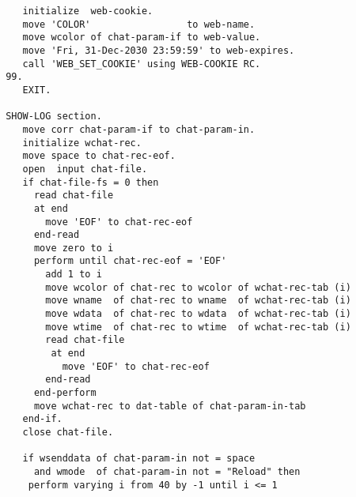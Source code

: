 {{\begin{verbatim}
          initialize  web-cookie.
          move 'COLOR'                 to web-name.
          move wcolor of chat-param-if to web-value.
          move 'Fri, 31-Dec-2030 23:59:59' to web-expires.
          call 'WEB_SET_COOKIE' using WEB-COOKIE RC.
       99.
          EXIT.

       SHOW-LOG section.
          move corr chat-param-if to chat-param-in.
          initialize wchat-rec.
          move space to chat-rec-eof.
          open  input chat-file.
          if chat-file-fs = 0 then
            read chat-file 
            at end
              move 'EOF' to chat-rec-eof
            end-read
            move zero to i
            perform until chat-rec-eof = 'EOF'
              add 1 to i
              move wcolor of chat-rec to wcolor of wchat-rec-tab (i)
              move wname  of chat-rec to wname  of wchat-rec-tab (i)
              move wdata  of chat-rec to wdata  of wchat-rec-tab (i)
              move wtime  of chat-rec to wtime  of wchat-rec-tab (i)
              read chat-file
               at end 
                 move 'EOF' to chat-rec-eof
              end-read
            end-perform
            move wchat-rec to dat-table of chat-param-in-tab
          end-if.
          close chat-file.
      
          if wsenddata of chat-param-in not = space 
            and wmode  of chat-param-in not = "Reload" then
           perform varying i from 40 by -1 until i <= 1
        

\end{verbatim}}}
